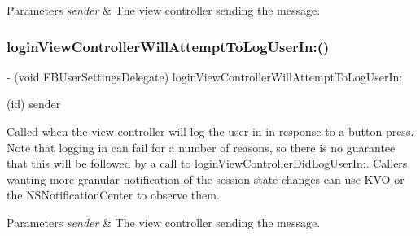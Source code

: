 \begin{DoxyParams}{Parameters}
{\em sender} & The view controller sending the message. \\
\hline
\end{DoxyParams}
\mbox{\label{protocolFBUserSettingsDelegate_01-p_a29fe822340933959a1b01785c50b7c4b}} 
\subsubsection{\texorpdfstring{login\+View\+Controller\+Will\+Attempt\+To\+Log\+User\+In\+:()}{loginViewControllerWillAttemptToLogUserIn:()}\hspace{0.1cm}{\footnotesize\ttfamily [2/5]}}
{\footnotesize\ttfamily -\/ (void F\+B\+User\+Settings\+Delegate) login\+View\+Controller\+Will\+Attempt\+To\+Log\+User\+In\+: \begin{DoxyParamCaption}\item[{(id)}]{sender }\end{DoxyParamCaption}\hspace{0.3cm}{\ttfamily [optional]}}

Called when the view controller will log the user in in response to a button press. Note that logging in can fail for a number of reasons, so there is no guarantee that this will be followed by a call to login\+View\+Controller\+Did\+Log\+User\+In\+:. Callers wanting more granular notification of the session state changes can use K\+VO or the N\+S\+Notification\+Center to observe them.


\begin{DoxyParams}{Parameters}
{\em sender} & The view controller sending the message. \\
\hline
\end{DoxyParams}
\mbox{\label{protocolFBUserSettingsDelegate_01-p_a29fe822340933959a1b01785c50b7c4b}} 
